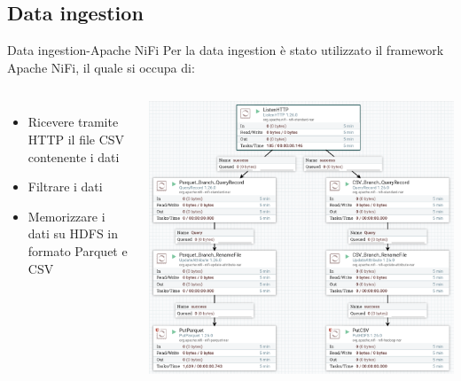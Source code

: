 \documentclass[13pt,aspectratio=169,t,xcolor=table]{beamer}
\begin{document}
\subsection{Data ingestion}
\begin{frame}{Data ingestion-Apache NiFi}
    Per la data ingestion è stato utilizzato il framework Apache NiFi, il quale si occupa di:
    \begin{columns}
            \begin{minipage}[b]{1\textwidth}
                \begin{itemize}
                    \item Ricevere tramite HTTP il file CSV contenente i dati
                    \item Filtrare i dati
                    \item Memorizzare i dati su HDFS in formato Parquet e CSV
                \end{itemize}
            \end{minipage}
            \begin{minipage}{1\textwidth}
                \begin{adjustbox}{margin=0cm 0cm 1.7cm 0cm, center} %
                    \includegraphics[width=1\textwidth]{res/nifi_flow.png}
                \end{adjustbox}
            \end{minipage}
    \end{columns}
\end{frame}
\end{document}
